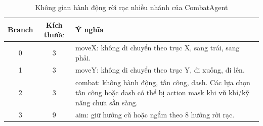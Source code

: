 \begin{table}[H]
    \centering
    \small
    \caption{Không gian hành động rời rạc nhiều nhánh của CombatAgent}
    \label{tab:action_space}
    \begin{tabular}{|c|c|p{9cm}|}
        \hline
        \textbf{Branch} & \textbf{Kích thước} & \textbf{Ý nghĩa} \\
        \hline
        0 & 3 & moveX: không di chuyển theo trục X, sang trái, sang phải. \\
        \hline
        1 & 3 & moveY: không di chuyển theo trục Y, đi xuống, đi lên. \\
        \hline
        2 & 3 & combat: không hành động, tấn công, dash. Các lựa chọn tấn công hoặc dash có thể bị action mask khi vũ khí/kỹ năng chưa sẵn sàng. \\
        \hline
        3 & 9 & aim: giữ hướng cũ hoặc ngắm theo 8 hướng rời rạc. \\
        \hline
    \end{tabular}
\end{table}

